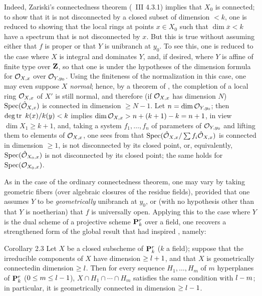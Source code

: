 Indeed, Zariski's connectedness theorem (\cf\ \EGA III 4.3.1) implies that $X_0$ is connected; to show that it is not disconnected by a closed subset of dimension $<k$, one is reduced to showing that the local rings at points $x\in X_0$ such that $\dim \overline{x}<k$ have a spectrum that is not disconnected by $x$. But this is true without assuming either that $f$ is proper or that $Y$ is unibranch at $y_0$. To see this, one is reduced to the case where $X$ is integral and dominates $Y$, and, if desired, where $Y$ is affine of finite type over $\ZZ$, so that one is under the hypotheses of the dimension formula for $\Oo_{X, x}$ over $\Oo_{Y, y_0}$. Using the finiteness of the normalization in this case, one may even suppose $X$ \emph{normal}; hence, by a theorem of , the completion of a local ring $\Oo_{X, x}$ of $X'$ is still normal, and therefore (if $\Oo_{X, x}$ has dimension $N$) $\Spec (\hat{\Oo}_{X, x})$ is connected in dimension $\ge N-1$. Let $n=\dim\Oo_{\sisi{X}{Y}, y_0}$; then $\degtr~k(x)/k(y)<k$ implies $\dim \Oo_{X, x}>n+(k+1)-k=n+1$, in view $\dim X_1\ge k+1$, and, taking a system $f_1, \dotsc, f_n$ of parameters of $\Oo_{Y, y_0}$ and lifting them to elements of $\Oo_{X, x}$, one sees from  that $\Spec (\hat{\Oo}_{X, x}/\sum f_i\hat{\Oo}_{X, x})$ is connected in dimension $\ge 1$, \ie is not disconnected by its closed point, or, equivalently, $\Spec(\hat{\Oo}_{X_0, x})$ is not disconnected by its closed point; \afortiori the same holds for $\Spec (\Oo_{X_0, x})$.

As in the case of the ordinary connectedness theorem, one may vary  by taking geometric fibers (over algebraic closures of the residue fields), provided that one assumes $Y$ to be \emph{geometrically} unibranch at $y_0$, or (with no hypothesis other than that $Y$ is noetherian) that $f$ is universally open. Applying this to the case where $Y$ is the dual scheme of a projective scheme $\PP_k^r$ over a field, one recovers a strengthened form of the global result that had inspired , namely:

\label{XIII.2.3}
\begin{enonce*}{Corollary 2.3\ndemark}
Let $X$ be a closed subscheme of $\PP^r_k$ ($k$ a field); suppose that the irreducible components of $X$ have dimension $\ge \sisi{k}{l}+1$, and that $X$ is geometrically connected\pageoriginaled in dimension $\ge \sisi{k}{l}$. Then for every sequence $H_1, \dotsc, H_m$ of $m$ hyperplanes of $\PP^r_k$ ($0\le m\le \sisi{k}{l}-1$), $X\cap H_1\cap \dotsb \cap H_m$ satisfies the same condition with $\sisi{k}{l}-m$; in particular, it is geometrically connected in dimension $\ge \sisi{k}{l}-1$.
\end{enonce*}

